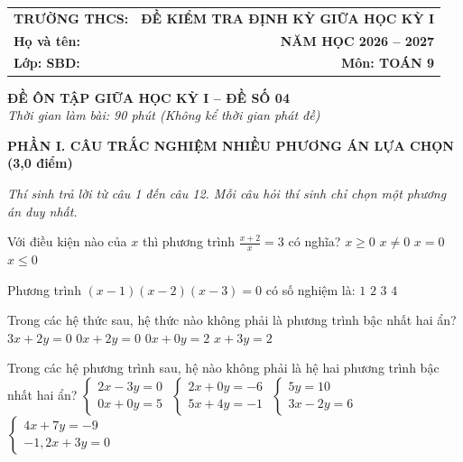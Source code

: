 \documentclass[12pt,a4paper]{article}
\begin{document}
\noindent
\begin{tabularx}{\linewidth}{X r}
\textbf{TRƯỜNG THCS: \dotfill} & \textbf{ĐỀ KIỂM TRA ĐỊNH KỲ GIỮA HỌC KỲ I} \\
\textbf{Họ và tên: \dotfill} & \textbf{NĂM HỌC 2026 -- 2027} \\
\textbf{Lớp: \dotfill \quad SBD: \dotfill} & \textbf{Môn: TOÁN 9} \\
\hline
\end{tabularx}
\vspace{2mm}

\begin{center}
  \textbf{\large ĐỀ ÔN TẬP GIỮA HỌC KỲ I -- ĐỀ SỐ 04}\\
  \textit{Thời gian làm bài: 90 phút (Không kể thời gian phát đề)}
\end{center}
\vspace{1mm}

\noindent\textbf{\large PHẦN I. CÂU TRẮC NGHIỆM NHIỀU PHƯƠNG ÁN LỰA CHỌN (3,0 điểm)}

\textit{Thí sinh trả lời từ câu 1 đến câu 12. Mỗi câu hỏi thí sinh chỉ chọn một phương án duy nhất.}

\vspace{1mm}
\begin{ex}
Với điều kiện nào của $x$ thì phương trình $\frac{x+2}{x} = 3$ có nghĩa?
\choice
{$x \ge 0$}
{\True $x \neq 0$}
{$x = 0$}
{$x \le 0$}
\end{ex}

\begin{ex}
Phương trình $(x - 1)(x - 2)(x - 3) = 0$ có số nghiệm là:
\choice
{$1$}
{$2$}
{\True $3$}
{$4$}
\end{ex}

\begin{ex}
Trong các hệ thức sau, hệ thức nào không phải là phương trình bậc nhất hai ẩn?
\choice
{$3x + 2y = 0$}
{$0x + 2y = 0$}
{\True $0x + 0y = 2$}
{$x + 3y = 2$}
\end{ex}

\begin{ex}
Trong các hệ phương trình sau, hệ nào không phải là hệ hai phương trình bậc nhất hai ẩn?
\choice
{\True $\begin{cases} 2x - 3y = 0 \\ 0x + 0y = 5 \end{cases}$}
{$\begin{cases} 2x + 0y = -6 \\ 5x + 4y = -1 \end{cases}$}
{$\begin{cases} 5y = 10 \\ 3x - 2y = 6 \end{cases}$}
{$\begin{cases} 4x + 7y = -9 \\ -1{,}2x + 3y = 0 \end{cases}$}
\end{ex}
\end{document}
